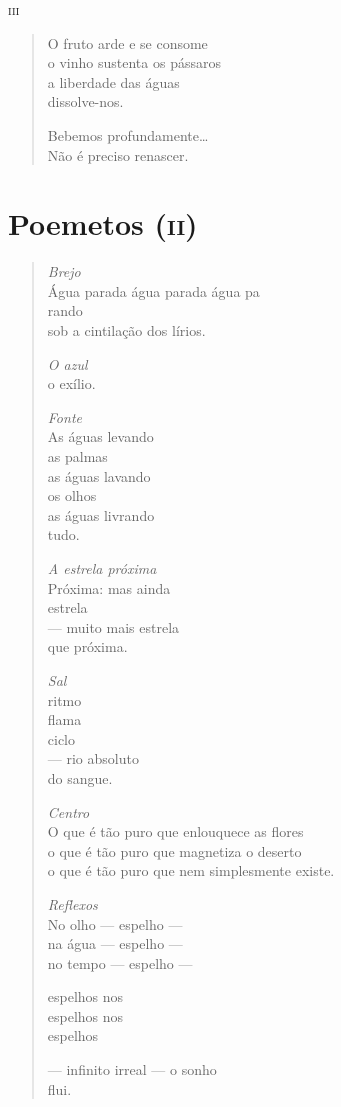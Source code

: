 \medskip
\textsc{iii}

\begin{verse}
O fruto arde e se consome\\
o vinho sustenta os pássaros\\
a liberdade das águas\\
dissolve-nos.

Bebemos profundamente\ldots{}\\
Não é preciso renascer.
\end{verse}

\chapter{Poemetos (\textsc{ii})}

\begin{verse}
\emph{Brejo}\\
Água parada água parada água pa\\
rando\\
sob a cintilação dos lírios.

\medskip
\emph{O azul}\\
o exílio.

\medskip
\emph{Fonte}\\
As águas levando\\
as palmas\\
as águas lavando\\
os olhos\\
as águas livrando\\
tudo.

\medskip
\emph{A estrela próxima}\\
Próxima: mas ainda\\
estrela\\
--- muito mais estrela\\
\quad que próxima.

\medskip
\emph{Sal}\\
ritmo\\
flama\\
ciclo\\
--- rio absoluto\\
\quad do sangue.

\medskip
\emph{Centro}\\
O que é tão puro que enlouquece as flores\\
o que é tão puro que magnetiza o deserto\\
o que é tão puro que nem simplesmente existe.

\medskip
\emph{Reflexos}\\
No olho --- espelho ---\\
na água --- espelho ---\\
no tempo --- espelho ---

espelhos nos\\
\qquad\qquad\quad espelhos nos\\
\qquad\qquad\quad\qquad\qquad\quad espelhos

--- infinito irreal --- o sonho\\
\qquad\qquad\quad\qquad\qquad\qquad flui.
\end{verse}

